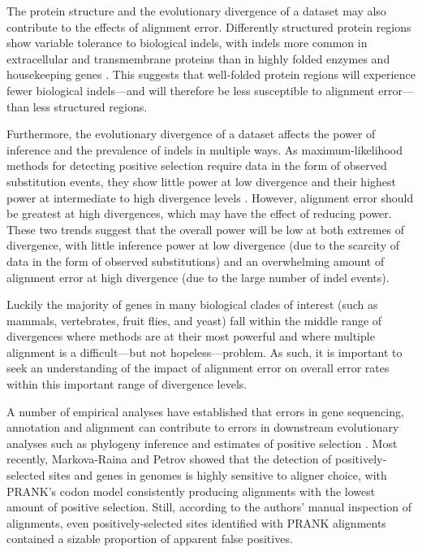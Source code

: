 \documentclass{article}
\begin{document}


The protein structure and the evolutionary divergence of a dataset may
also contribute to the effects of alignment error. Differently
structured protein regions show variable tolerance to biological
indels, with indels more common in extracellular and transmembrane
proteins than in highly folded enzymes and housekeeping genes
\citep{delaChaux2007DNA}. This suggests that well-folded protein
regions will experience fewer biological indels---and will therefore
be less susceptible to alignment error---than less structured
regions.

Furthermore, the evolutionary divergence of a dataset affects the
power of \sw inference and the prevalence of indels in multiple
ways. As maximum-likelihood methods for detecting positive selection
require data in the form of observed substitution events, they show
little power at low divergence and their highest power at intermediate
to high divergence levels \citep{Anisimova2001Accuracy}. However,
alignment error should be greatest at high divergences, which may have
the effect of reducing power. These two trends suggest that the
overall power will be low at both extremes of divergence, with little
inference power at low divergence (due to the scarcity of data in the
form of observed substitutions) and an overwhelming amount of
alignment error at high divergence (due to the large number of indel
events).

Luckily the majority of genes in many biological clades of interest
(such as mammals, vertebrates, fruit flies, and yeast) fall within the
middle range of divergences where \sw methods are at their most
powerful and where multiple alignment is a difficult---but not
hopeless---problem. As such, it is important to seek an understanding
of the impact of alignment error on overall error rates within this
important range of divergence levels.

A number of empirical analyses have established that errors in gene
sequencing, annotation and alignment can contribute to errors in
downstream evolutionary analyses such as phylogeny inference
\citep{Wong2008Alignment} and estimates of positive selection
\citep{Schneider2009Estimates,Markova-Raina2011High}. Most recently,
Markova-Raina and Petrov \citeyearpar{Markova-Raina2011High} showed
that the detection of positively-selected sites and genes in \Dr
genomes is highly sensitive to aligner choice, with PRANK's codon
model \citep{Loytynoja2008PhylogenyAware} consistently producing
alignments with the lowest amount of positive selection. Still,
according to the authors' manual inspection of alignments, even
positively-selected sites identified with PRANK alignments contained a
sizable proportion of apparent false positives.
\end{document}
